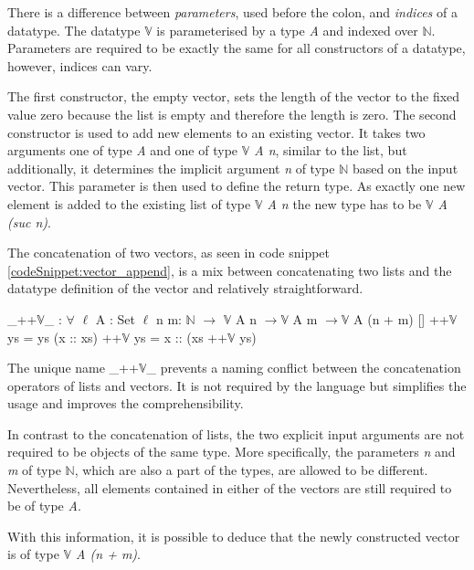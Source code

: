 There is a difference between \emph{parameters}, used before the colon, and \emph{indices} of a datatype.
The datatype $\mathbb{V}$ is parameterised by a type \emph{A} and indexed over $\mathbb{N}$\cite{norell:deptyped}.
Parameters are required to be exactly the same for all constructors of a datatype, however, indices can vary.

The first constructor, the empty vector, sets the length of the vector to the fixed value zero because the list is empty and therefore the length is zero.
The second constructor is used to add new elements to an existing vector. It takes two arguments one of type \emph{A} and one of type \emph{$\mathbb{V}$ A n}, similar to the list, but additionally, it determines the implicit argument \emph{n} of type $\mathbb{N}$ based on the input vector.
This parameter is then used to define the return type. As exactly one new element is added to the existing list of type \emph{$\mathbb{V}$ A n} the new type has to be \emph{$\mathbb{V}$ A (suc n)}.

The concatenation of two vectors, as seen in code snippet \ref{codeSnippet:vector_append}, is a mix between concatenating two lists and the datatype definition of the vector and relatively straightforward.

\begin{codesnippet}[mathescape=true, caption={Vector concatenation function}, label={codeSnippet:vector_append}]
_++$\mathbb{V}$_ : $\forall$ {$\ell$} {A : Set $\ell$}  {n m: $\mathbb{N}$} $\rightarrow$
        $\mathbb{V}$ A n $\rightarrow \mathbb{V}$ A m $\rightarrow \mathbb{V}$ A (n + m)
  []        ++$\mathbb{V}$ ys = ys
  (x :: xs) ++$\mathbb{V}$ ys = x :: (xs ++$\mathbb{V}$ ys)
\end{codesnippet}
The unique name \_++$\mathbb{V}$\_ prevents a naming conflict between the concatenation operators of lists and vectors.
It is not required by the language but simplifies the usage and improves the comprehensibility.

In contrast to the concatenation of lists, the two explicit input arguments are not required to be objects of the same type.
More specifically, the parameters \emph{n} and \emph{m} of type $\mathbb{N}$, which are also a part of the types, are allowed to be different. 
Nevertheless, all elements contained in either of the vectors are still required to be of type \emph{A}.

With this information, it is possible to deduce that the newly constructed vector is of type \emph{$\mathbb{V}$ A (n + m)}.


